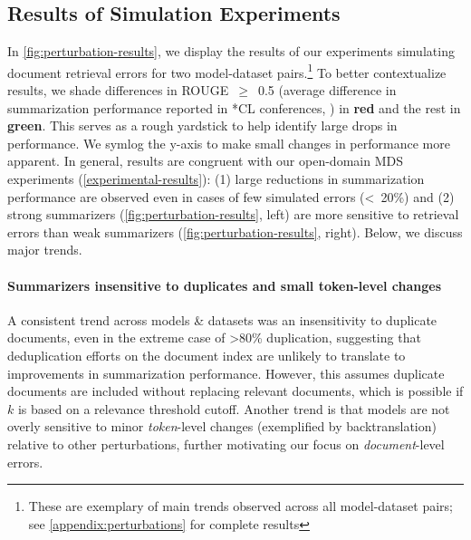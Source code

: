 \documentclass[11pt]{article}
\begin{document}
\subsection{Results of Simulation Experiments} \label{experimental-results:simulations}

In \autoref{fig:perturbation-results}, we display the results of our experiments simulating document retrieval errors for two model-dataset pairs.\footnote{These are exemplary of main trends observed across all model-dataset pairs; see \autoref{appendix:perturbations} for complete results} To better contextualize results, we shade differences in ROUGE~$\geq$~0.5 (average difference in summarization performance reported in *CL conferences, \citealp{deutsch-etal-2022-examining}) in \textcolor{MyRed}{\textbf{red}} and the rest in \textcolor{MyGreen}{\textbf{green}}. This serves as a rough yardstick to help identify large drops in performance. We symlog \citep{symlog} the y-axis to make small changes in performance more apparent. In general, results are congruent with our open-domain MDS experiments (\textsection \ref{experimental-results}): (1) large reductions in summarization performance are observed even in cases of few simulated errors (<~20\%) and (2) strong summarizers (\autoref{fig:perturbation-results}, left) are more sensitive to retrieval errors than weak summarizers (\autoref{fig:perturbation-results}, right). Below, we discuss major trends.

\paragraph{Summarizers insensitive to duplicates and small token-level changes}
A consistent trend across models \& datasets was an insensitivity to duplicate documents, even in the extreme case of >80\% duplication, suggesting that deduplication efforts on the document index are unlikely to translate to improvements in summarization performance. However, this assumes duplicate documents are included without replacing relevant documents, which is possible if \(k\) is based on a relevance threshold cutoff. Another trend is that models are not overly sensitive to minor \textit{token}-level changes (exemplified by backtranslation) relative to other perturbations, further motivating our focus on \textit{document}-level errors.
\end{document}
